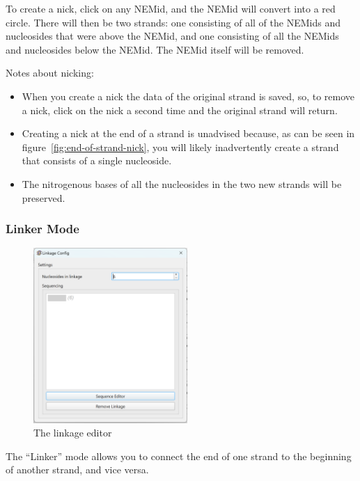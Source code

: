 \documentclass[titlepage]{article}
\begin{document}
To create a nick, click on any NEMid, and the NEMid will convert into a red circle. There will then be two strands: one consisting of all of the NEMids and nucleosides that were above the NEMid, and one consisting of all the NEMids and nucleosides below the NEMid. The NEMid itself will be removed.

Notes about nicking:
\begin{itemize}
	\item When you create a nick the data of the original strand is saved, so, to remove a nick, click on the nick a second time and the original strand will return.
	\item Creating a nick at the end of a strand is unadvised because, as can be seen in figure~\ref{fig:end-of-strand-nick}, you will likely inadvertently create a strand that consists of a single nucleoside.
	\item The nitrogenous bases of all the nucleosides in the two new strands will be preserved.
\end{itemize}

\subsubsection{Linker Mode}

\begin{figure}[h] \label{fig:linkage-editor}
	\centering
	\caption{The linkage editor}
	\includegraphics[width=2.3in]{linkage-editor.png}
\end{figure}

The ``Linker'' mode allows you to connect the end of one strand to the beginning of another strand, and vice versa.
\end{document}
